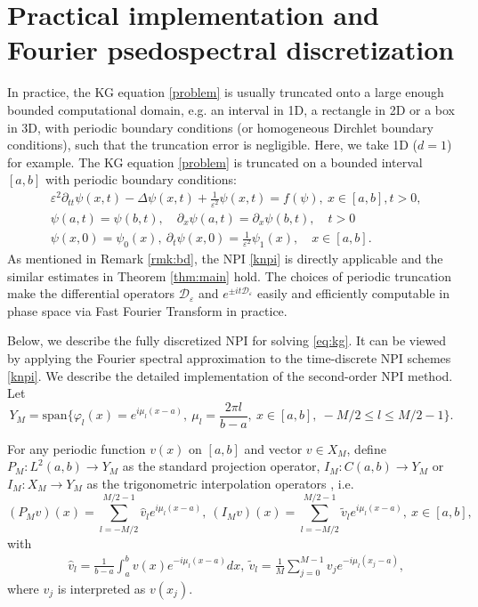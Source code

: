 \documentclass[final,leqno,showlabe]{siamltex}
\begin{document}
\section{Practical implementation and Fourier psedospectral discretization}
\label{sec:fnpi}
In practice, the KG equation \eqref{problem} is usually truncated onto a large enough bounded computational domain, e.g. an interval in 1D, a rectangle in 2D or a box in 3D, with periodic boundary conditions (or homogeneous Dirchlet boundary conditions), such that the truncation error is negligible. Here, we take 1D ($d=1$) for example. The KG equation \eqref{problem} is truncated on a bounded interval $[a,b]$ with periodic boundary conditions:
\begin{equation}\label{eq:kg}
\begin{split}
&\varepsilon^2\partial_{tt}\psi(x,t)-\Delta\psi(x,t)+\frac{1}{\varepsilon^2}\psi(x,t)=f(\psi),\ x\in [a,b], t>0, \\
&\psi(a,t)=\psi(b,t),\quad \partial_x\psi(a,t)=\partial_x\psi(b,t),\quad t>0\\
&\psi(x,0)=\psi_0(x),\ \partial_t\psi(x,0)=\frac{1}{\varepsilon^2}\psi_1(x), \quad x\in [a,b].
\end{split}
\end{equation}
As mentioned in Remark \eqref{rmk:bd}, the NPI \eqref{knpi} is directly applicable and the similar estimates in Theorem \ref{thm:main} hold. The choices of periodic truncation make the differential operators $\mathcal{D}_\varepsilon$ and $e^{\pm it\mathcal{D}_\varepsilon}$ easily and efficiently computable in phase space via Fast Fourier Transform in practice.


Below, we describe the fully discretized NPI for solving \eqref{eq:kg}. It can be viewed by applying the Fourier spectral approximation to the time-discrete NPI schemes \eqref{knpi}. We describe the detailed implementation of the second-order NPI method.
Let
$$Y_{M}=\text{span}\{\varphi_{l}(x)=e^{i\mu_{l}(x-a)},\ \mu_{l}=\frac{2\pi l}{b-a}, \ x\in[a,b],\ -M/2\leq l\leq M/2-1\}.$$

For any periodic function $v(x)$ on $[a,b]$ and vector $v\in X_{M}$, define $P_{M}:L^2(a,b)\rightarrow Y_{M}$ as the standard projection operator, $I_{M}:C(a,b)\rightarrow Y_{M}$ or $I_{M}:X_{M}\rightarrow Y_{M}$ as the trigonometric interpolation operators \cite{1multiscale:2014,finiteE:2012}, i.e.
$$(P_{M}v)(x)=\sum_{l=-M/2}^{M/2-1}{\hat v}_{l}e^{i\mu_{l}(x-a)},\ (I_{M}v)(x)=\sum_{l=-M/2}^{M/2-1}{\tilde v}_{l}e^{i\mu_{l}(x-a)},\ x\in [a,b],$$
with
\begin{align}\label{coefficient}
&{\hat v}_{l}=\frac{1}{b-a}\int_{a}^{b}v(x)e^{-i\mu_{l}(x-a)}dx,\ {\tilde v}_{l}=\frac{1}{M}\sum_{j=0}^{M-1}v_{j}e^{-i\mu_{l}(x_{j}-a)},
\end{align}
where $v_{j}$ is interpreted as $v(x_{j})$.
\end{document}
